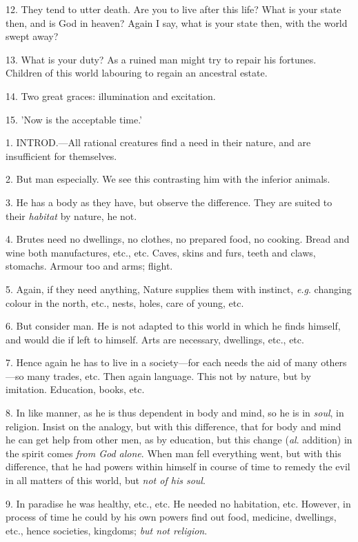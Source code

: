 12. They tend to utter death. Are you to live
after this life? What is your state then, and is God in heaven?
Again I say, what is your state then, with the world swept away?

13. What is your duty? As a ruined man might try
to repair his fortunes. Children of this world labouring to regain an
ancestral estate.

14. Two great graces: illumination and
excitation.

15. 'Now is the acceptable time.'


1. INTROD.—All
rational creatures find a need in their nature, and are insufficient
for themselves.

2. But man especially. We see this contrasting
him with the inferior animals.

3. He has a body as they have, but observe the
difference. They are suited to their \emph{habitat} by nature, he not.

4. Brutes need no dwellings, no clothes, no
prepared food, no cooking. Bread and wine both manufactures, etc.,
etc. Caves, skins and furs, teeth and claws, stomachs. Armour too and
arms; flight.

5. Again, if they need anything, Nature supplies
them with instinct, \emph{e.g}. changing colour in the north, etc.,
nests, holes, care of young, etc.

6. But consider man. He is not adapted to this
world in which he finds himself, and would die if left to himself.
Arts are necessary, dwellings, etc., etc.

7. Hence again he has to live in a society—for
each needs the aid of many others—so many trades, etc. Then again
language. This not by nature, but by imitation. Education, books, etc.

8. In like manner, as he is thus dependent in
body and mind, so he is in \emph{soul}, in religion. Insist on the
analogy, but with this difference, that for body and mind he can get
help from other men, as by education, but this change (\emph{al}.
addition) in the spirit comes \emph{from God alone}. When man fell
everything went, but with this difference, that he had powers within
himself in course of time to remedy the evil in all matters of this
world, but \emph{not of his soul}.

9. In paradise he was healthy, etc., etc. He
needed no habitation, etc. However, in process of time he could by his
own powers find out food, medicine, dwellings, etc., hence societies,
kingdoms; \emph{but not religion}.

